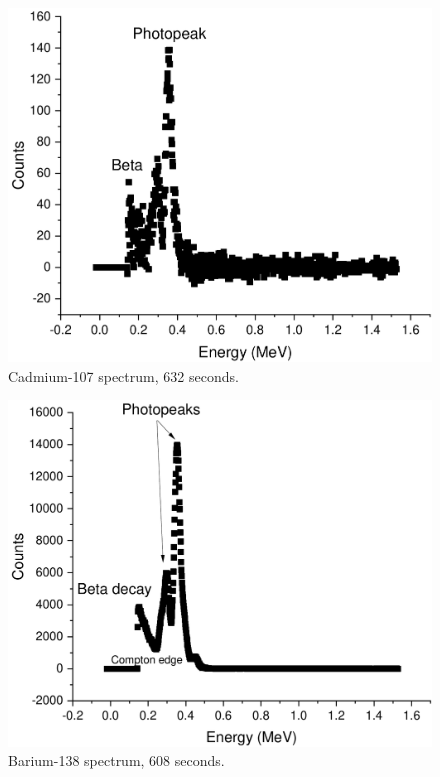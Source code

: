 \documentclass[notitlepage]{report}
\begin{document}
\begin{figure}[p]
	\centering
	\includegraphics[width=0.7\linewidth]{cd107}
	\caption{Cadmium-107 spectrum, 632 seconds.}
	\label{fig:cd107}
\end{figure}
\begin{figure}[p]
	\centering
	\includegraphics[width=0.7\linewidth]{ba138}
	\caption{Barium-138 spectrum, 608 seconds.}
	\label{fig:ba138}
\end{figure}
\end{document}
